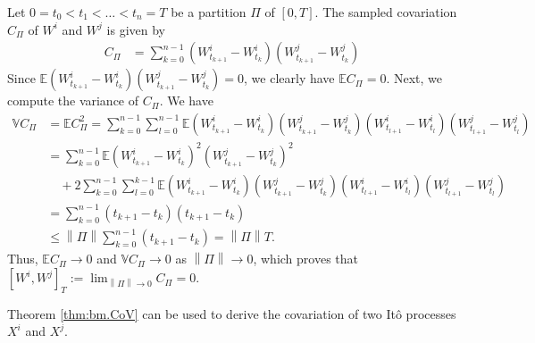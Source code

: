 \documentclass[12pt]{book}
\numberwithin{equation}{chapter}
\theoremstyle{plain}
\newtheorem{theorem}{\underline{Theorem}}
\numberwithin{theorem}{section}
\theoremstyle{definition}
\numberwithin{exercise}{chapter}
\let\oldendproof\endproof
\renewenvironment{proof}[1][\proofname]{%
  \oldproof[\scshape\underline{#1}]%
}{\oldendproof}
\newcommand{\<}{\langle}
\renewcommand{\>}{\rangle}
\renewcommand{\(}{\left(}
\renewcommand{\)}{\right)}
\renewcommand{\[}{\left[}
\renewcommand{\]}{\right]}
\newcommand\Eb{\mathds{E}}
\newcommand\Vb{\mathds{V}}
\newcommand\sig{\sigma}
\newcommand\dd{\mathrm{d}}
\newcommand{\norm}[1]{\left\|#1\right\|}
\begin{document}
\begin{proof}
Let $0 = t_0 < t_1 < \ldots < t_n = T$ be a partition $\Pi$ of $[0,T]$.  The sampled covariation $C_\Pi$ of $W^i$ and $W^j$ is given by
\begin{align}
C_\Pi
	&=	\sum_{k=0}^{n-1} \( W_{t_{k+1}}^i - W_{t_k}^i \)\( W_{t_{k+1}}^j - W_{t_k}^j \)
\end{align}
Since $\Eb \( W_{t_{k+1}}^i - W_{t_k}^i \)\( W_{t_{k+1}}^j - W_{t_k}^j \) = 0$, we clearly have $\Eb C_\Pi = 0$.  
Next, we compute the variance of $C_\Pi$.  We have
\begin{align}
\Vb C_\Pi
	&=	\Eb C_\Pi^2
	=		\sum_{k=0}^{n-1} \sum_{l=0}^{n-1} 
			\Eb \( W_{t_{k+1}}^i - W_{t_k}^i \) \( W_{t_{k+1}}^j - W_{t_k}^j \) \( W_{t_{l+1}}^i - W_{t_l}^i \) \( W_{t_{l+1}}^j - W_{t_l}^j \) \\
	&=	\sum_{k=0}^{n-1} \Eb \( W_{t_{k+1}}^i - W_{t_k}^i \)^2 \( W_{t_{k+1}}^j - W_{t_k}^j \)^2 \\ &\quad
			+ 2 \sum_{k=0}^{n-1} \sum_{l=0}^{k-1} 
			\Eb \( W_{t_{k+1}}^i - W_{t_k}^i \) \( W_{t_{k+1}}^j - W_{t_k}^j \) \( W_{t_{l+1}}^i - W_{t_l}^i \) \( W_{t_{l+1}}^j - W_{t_l}^j \) \\
	&=	\sum_{k=0}^{n-1}\({t_{k+1}} - {t_k} \) \( {t_{k+1}} -{t_k}\) \\
	&\leq \norm{\Pi} \sum_{k=0}^{n-1} \({t_{k+1}} - {t_k} \)
	=		\norm{\Pi} T .	
\end{align}
Thus, $\Eb C_\Pi \to 0$ and $\Vb C_\Pi \to 0$ as $\norm{\Pi} \to 0$, which proves that $[W^i,W^j]_T := \lim_{\norm{\Pi} \to 0} C_\Pi = 0$.
\end{proof}

\noindent
Theorem \ref{thm:bm.CoV} can be used to derive the covariation of two It\^o processes $X^i$ and $X^j$.

\end{document}
